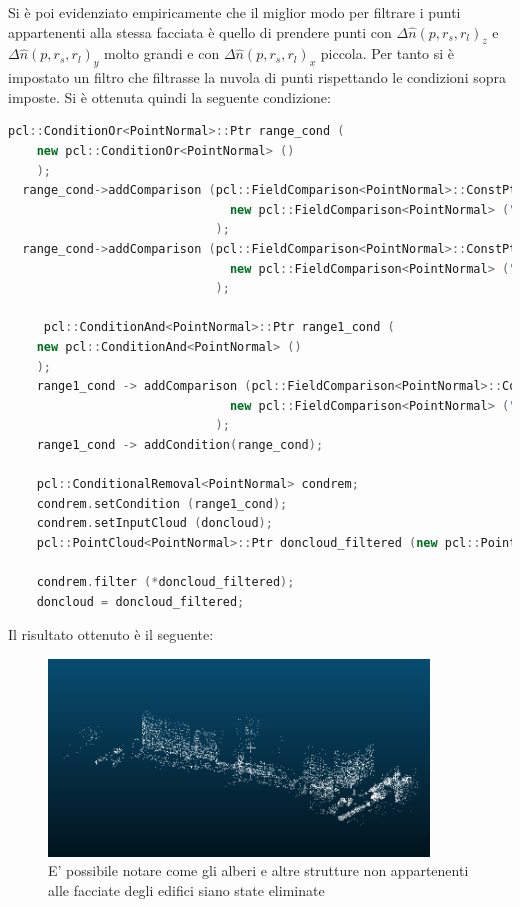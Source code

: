 Si è poi evidenziato empiricamente che il miglior modo per filtrare i punti appartenenti alla stessa facciata è quello di prendere punti con $\Delta\hat{n}(p,r_s,r_l)_z$ e $\Delta\hat{n}(p,r_s,r_l)_y$ molto grandi e con $\Delta\hat{n}(p,r_s,r_l)_x$ piccola. Per tanto si è impostato un filtro che filtrasse la nuvola di punti rispettando le condizioni sopra imposte. Si è ottenuta quindi la seguente condizione:
\begin{lstlisting}[caption={Filtraggio della pointcloud dopo l'applicazione dell' operatore DoN},captionpos=b,language=cpp]
    pcl::ConditionOr<PointNormal>::Ptr range_cond (
    new pcl::ConditionOr<PointNormal> ()
    );
  range_cond->addComparison (pcl::FieldComparison<PointNormal>::ConstPtr (
                               new pcl::FieldComparison<PointNormal> ("normal_z", pcl::ComparisonOps::GT, z_normthreshold))
                             );
  range_cond->addComparison (pcl::FieldComparison<PointNormal>::ConstPtr (
                               new pcl::FieldComparison<PointNormal> ("normal_y", pcl::ComparisonOps::GT, y_normthreshold))
                             );

     pcl::ConditionAnd<PointNormal>::Ptr range1_cond (
    new pcl::ConditionAnd<PointNormal> ()
    );        
    range1_cond -> addComparison (pcl::FieldComparison<PointNormal>::ConstPtr (
                               new pcl::FieldComparison<PointNormal> ("normal_x", pcl::ComparisonOps::LT, x_normthreshold))
                             );        
    range1_cond -> addCondition(range_cond);
    
    pcl::ConditionalRemoval<PointNormal> condrem;
    condrem.setCondition (range1_cond);
    condrem.setInputCloud (doncloud);
    pcl::PointCloud<PointNormal>::Ptr doncloud_filtered (new pcl::PointCloud<PointNormal>);
    
    condrem.filter (*doncloud_filtered);
    doncloud = doncloud_filtered;
\end{lstlisting}
Il risultato ottenuto è il seguente:
\begin{figure}[H]
    \centering
    \includegraphics[width=0.9\textwidth]{Immagini/Don_Filtered.png}
    \caption{E' possibile notare come gli alberi e altre strutture non appartenenti alle facciate degli edifici siano state eliminate}
    \label{fig:DoNfiltered}
\end{figure}
\newpage
